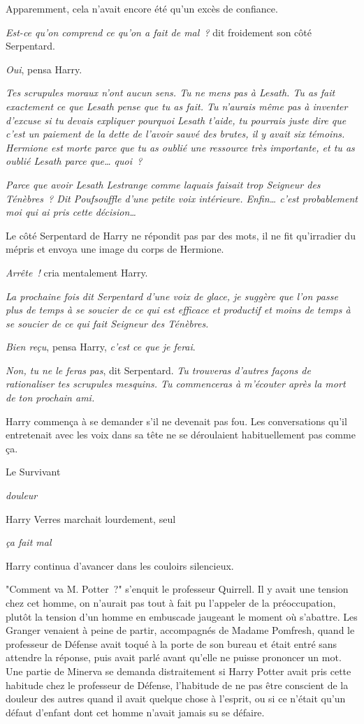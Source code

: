 Apparemment, cela n'avait encore été qu'un excès de confiance.

\emph{Est-ce qu'on comprend ce qu'on a fait de mal~?} dit froidement son côté Serpentard.

\emph{Oui}, pensa Harry.

\emph{Tes scrupules moraux n'ont aucun sens. Tu ne mens pas à Lesath. Tu as fait exactement ce que Lesath pense que tu as fait. Tu n'aurais même pas à inventer d'excuse si tu devais expliquer pourquoi Lesath t'aide, tu pourrais juste dire que c'est un paiement de la dette de l'avoir sauvé des brutes, il y avait six témoins. Hermione est morte parce que tu as oublié une ressource très importante, et tu as oublié Lesath parce que… quoi~?}

\emph{Parce que avoir Lesath Lestrange comme laquais faisait trop Seigneur des Ténèbres~? Dit Poufsouffle d'une petite voix intérieure. Enfin… c'est probablement moi qui ai pris cette décision…}

Le côté Serpentard de Harry ne répondit pas par des mots, il ne fit qu'irradier du mépris et envoya une image du corps de Hermione.

\emph{Arrête~!} cria mentalement Harry.

\emph{La prochaine fois dit Serpentard d'une voix de glace, je suggère que l'on passe plus de temps à se soucier de ce qui est efficace et productif et moins de temps à se soucier de ce qui fait Seigneur des Ténèbres.}

\emph{Bien reçu}, pensa Harry, \emph{c'est ce que je ferai}.

\emph{Non, tu ne le feras pas}, dit Serpentard. \emph{Tu trouveras d'autres façons de rationaliser tes scrupules mesquins. Tu commenceras à m'écouter après la mort de ton prochain ami.}

Harry commença à se demander s'il ne devenait pas fou. Les conversations qu'il entretenait avec les voix dans sa tête ne se déroulaient habituellement pas comme ça.

Le Survivant

\emph{douleur}

Harry Verres marchait lourdement, seul

\emph{ça fait mal}

Harry continua d'avancer dans les couloirs silencieux.

\later

"Comment va M. Potter~?" s'enquit le professeur Quirrell. Il y avait une tension chez cet homme, on n'aurait pas tout à fait pu l'appeler de la préoccupation, plutôt la tension d'un homme en embuscade jaugeant le moment où s'abattre. Les Granger venaient à peine de partir, accompagnés de Madame Pomfresh, quand le professeur de Défense avait toqué à la porte de son bureau et était entré sans attendre la réponse, puis avait parlé avant qu'elle ne puisse prononcer un mot. Une partie de Minerva se demanda distraitement si Harry Potter avait pris cette habitude chez le professeur de Défense, l'habitude de ne pas être conscient de la douleur des autres quand il avait quelque chose à l'esprit, ou si ce n'était qu'un défaut d'enfant dont cet homme n'avait jamais su se défaire.

